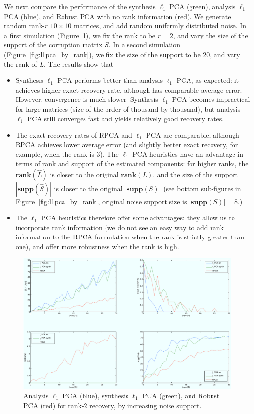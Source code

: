 We next compare the performance of the synthesis $\ell_1$ PCA (green), analysis $\ell_1$ PCA (blue), and Robust PCA with no rank information (red). We generate random rank-$r$ $10\times 10$ matrices, and add random uniformly distributed noise. In a first simulation (Figure~\ref{fig:l1pca_by_support}), we fix the rank to be $r = 2$, and vary the size of the support of the corruption matrix $S$. In a second simulation (Figure~\ref{fig:l1pca_by_rank}), we fix the size of the support to be $20$, and vary the rank of $L$. The results show that
\begin{itemize}
\item Synthesis $\ell_1$ PCA performs better than analysis $\ell_1$ PCA, as expected: it achieves higher exact recovery rate, although has comparable average error. However, convergence is much slower. Synthesis $\ell_1$ PCA becomes impractical for large matrices (size of the order of thousand by thousand), but analysis $\ell_1$ PCA still converges fast and yields relatively good recovery rates.
\item The exact recovery rates of RPCA and  $\ell_1$ PCA are comparable, although RPCA achieves lower average error (and slightly better exact recovery, for example, when the rank is $3$). The $\ell_1$ PCA heuristics have an advantage in terms of rank and support of the estimated components: for higher ranks, the $\mathbf{rank}(\hat{L})$ is closer to the original $\mathbf{rank}(L)$, and the size of the support $|\mathbf{supp}(\hat{S})|$ is closer to the original $|\mathbf{supp}(S)|$ (see bottom sub-figures in Figure~\ref{fig:l1pca_by_rank}, original noise support size is $|\mathbf{supp}(S)| = 8$.)
\item The $\ell_1$ PCA heuristics therefore offer some advantages: they allow us to incorporate rank information (we do not see an easy way to add rank information to the RPCA formulation when the rank is strictly greater than one), and offer more robustness when the rank is high.
\end{itemize}
%
\begin{figure}[h!]
\centering
\includegraphics[width=\textwidth]{../figures/l1pca_10x10_rank2_by_support.pdf}
\caption{Analysis $\ell_1$ PCA (blue), synthesis $\ell_1$ PCA (green), and Robust PCA (red) for rank-$2$ recovery, by increasing noise support.}
\label{fig:l1pca_by_support}
\end{figure}

